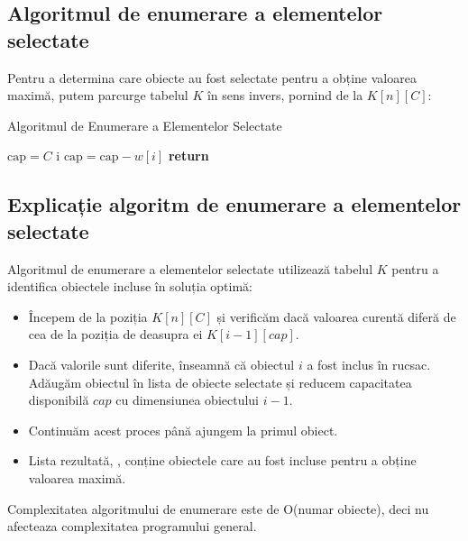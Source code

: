 \documentclass[a4paper,12pt]{article}
\begin{document}
\subsection{Algoritmul de enumerare a elementelor selectate}

Pentru a determina care obiecte au fost selectate pentru a obține valoarea maximă, putem parcurge tabelul \( K \) în sens invers, pornind de la \( K[n][C] \):

\begin{algorithm}
\caption{Algoritmul de Enumerare a Elementelor Selectate}
\begin{algorithmic}[1]

\STATE {} 
\STATE \( \text{cap} = C \)
        \STATE {} i  
        \STATE \( \text{cap} = \text{cap} - w[i] \)
    \ENDIF
\ENDFOR
\STATE \textbf{return} 
\end{algorithmic}
\end{algorithm}

\subsection{Explicație algoritm de enumerare a elementelor selectate}

Algoritmul de enumerare a elementelor selectate utilizează tabelul \( K \) pentru a identifica obiectele incluse în soluția optimă:

\begin{itemize}
    \item Începem de la poziția \( K[n][C] \) și verificăm dacă valoarea curentă diferă de cea de la poziția de deasupra ei \( K[i-1][cap] \).
    \item Dacă valorile sunt diferite, înseamnă că obiectul \( i \) a fost inclus în rucsac. Adăugăm obiectul în lista de obiecte selectate și reducem capacitatea disponibilă \( cap \) cu dimensiunea obiectului \( i-1 \).
    \item Continuăm acest proces până ajungem la primul obiect.
    \item Lista rezultată, , conține obiectele care au fost incluse pentru a obține valoarea maximă.
\end{itemize}

Complexitatea algoritmului de enumerare este de O(numar obiecte), deci nu afecteaza complexitatea programului general.
\end{document}
